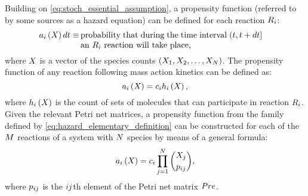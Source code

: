 Building on \eqref{eq:stoch_essential_assumption}, a propensity function (referred to by some sources as a hazard equation\cite{Wilkinson:2012tt}) can be defined for each reaction $R_{i}$:
\begin{align}\label{eq:hazard_definition}
    \haz \dt \equiv&\, \parbox[t]{0.63\linewidth}{probability that during the time interval $\timeint$ an $\rxn$ reaction will take place,}
\end{align}
where $X_{}$ is a vector of the species counts $\left( {X}_{1}, {X}_{2}, \dots, {X}_{N} \right)$. The propensity function of any reaction following mass action kinetics can be defined as:
\begin{equation}\label{eq:hazard_elementary_definition}
    a_{i} \left( X_{} \right) = c_{i} h_{i} \left( X_{} \right),
\end{equation}
where $h_{i} \left( X_{} \right)$ is the count of sets of molecules that can participate in reaction $R_{i}$. Given the relevant Petri net matrices, a propensity function from the family defined by \eqref{eq:hazard_elementary_definition} can be constructed for each of the $M$ reactions of a system with $N$ species by means of a general formula\cite{Wilkinson:2012tt}:
\begin{equation}\label{eq:hazard_general_formula}
    a_{i} \left( X_{} \right) = c_{i} \prod_{j=1}^{N} \binom{X_{j}}{p_{i j}},
\end{equation}
where $p_{i j}$ is the $i j$th element of the Petri net matrix $Pre$.

